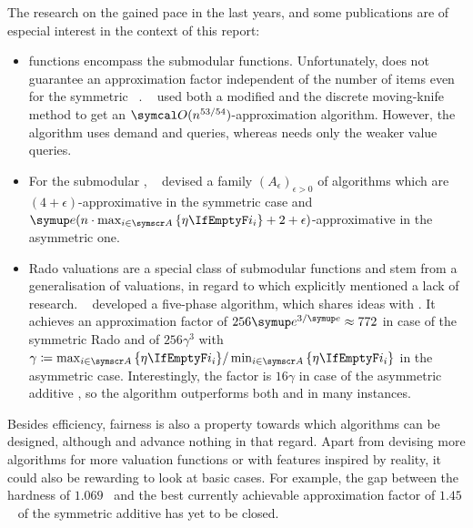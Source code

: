 The research on the \NSW{} gained pace in the last years, and some publications are of especial interest in the context of this report:
\begin{itemize}
	\item
	\XOS{} functions encompass the submodular functions.
	Unfortunately, \RepReMatch{} does not guarantee an approximation factor independent of the number of items even for the symmetric \XOS{} \NSW~\cite[Section 6.2]{APNSWuSVþUM}.
	~\cite{sublin_approx_algo_for_nsw_with_xos_valuations} used both a modified \RepReMatch{} and the discrete moving-knife method to get an \(\bigo(n^{53/54})\)-approximation algorithm.
	However, the algorithm uses demand and \XOS{} queries, whereas \RepReMatch{} needs only the weaker value queries.

	\item
	For the submodular \NSW, \citeauthor{approx_nsw_by_matching_and_local_search}~\cite{approx_nsw_by_matching_and_local_search} devised a family \((A_\epsilon)_{\epsilon > 0}\) of algorithms which are \((4+\epsilon)\)-approximative in the symmetric case and \(\euler(n \cdot \max_{i \in \agents} \,\braces{\weight} + 2 + \epsilon)\)-approximative in the asymmetric one.

	\item
	Rado valuations are a special class of submodular functions and stem from a generalisation of \OXS{} valuations, in regard to which \citeauthor{APNSWuSVþUM} explicitly mentioned a lack of research.
	~\cite{approximating_nsw_under_rado_valuations} developed a five-phase algorithm, which shares ideas with \RepReMatch.
	It achieves an approximation factor of \(256 \euler^{3/\euler} \approx 772\) in case of the symmetric Rado \NSW{} and of \(256 \gamma^3\) with \(\gamma \coloneq \max_{i \in \agents} \,\braces{\weight} / \min_{i \in \agents} \,\braces{\weight}\) in the asymmetric case.
	Interestingly, the factor is \(16 \gamma\) in case of the asymmetric additive \NSW, so the algorithm outperforms both \SMatch{} and \RepReMatch{} in many instances.
\end{itemize}
Besides efficiency, fairness is also a property towards which algorithms can be designed, although \SMatch{} and \RepReMatch{} advance nothing in that regard.
Apart from devising more algorithms for more valuation functions or with features inspired by reality, it could also be rewarding to look at basic cases.
For example, the gap between the hardness of \(1.069\)~\cite{satiation_in_fisher_markets_and_approx_of_nsw} and the best currently achievable approximation factor of \(1.45\)~\cite{finding_fair_and_efficient_allocs} of the symmetric additive \NSW{} has yet to be closed.